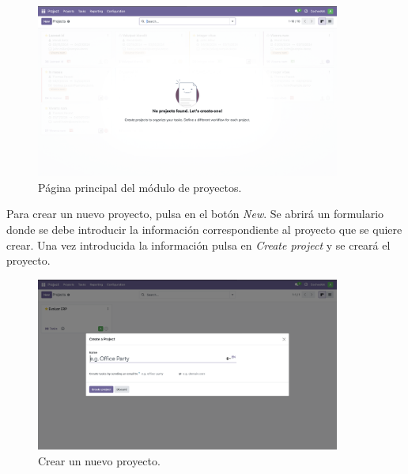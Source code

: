 \documentclass[paper=a4wide, fontsize=11pt]{report}	 %
\begin{document}
\begin{figure}[h]
    \centering
    \includegraphics[width=10cm]{emptyProject.png}
    \caption{Página principal del módulo de proyectos.}
    \label{fig:openProyectos}
\end{figure}
 Para crear un nuevo proyecto, pulsa en el botón \textit{New}. Se abrirá un formulario donde se debe introducir la información correspondiente al proyecto que se quiere crear. Una vez introducida la información pulsa en \textit{Create project} y se creará el proyecto.
\begin{figure}[h]
    \centering
    \includegraphics[width=10cm]{addProject.png}
    \caption{Crear un nuevo proyecto.}
    \label{fig:openProyectos}
\end{figure}
\newpage
\end{document}
